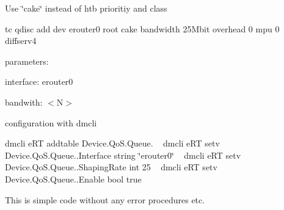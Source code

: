 Use \char`\"{}cake\char`\"{} instead of htb prioritiy and class

tc qdisc add dev erouter0 root cake bandwidth 25Mbit overhead 0 mpu 0 diffserv4

parameters\+:
\begin{DoxyItemize}
\item interface\+: erouter0 ~\newline

\item bandwith\+: $<$\+N$>$ ~\newline

\end{DoxyItemize}

configuration with dmcli

dmcli e\+RT addtable Device.\+Qo\+S.\+Queue. ~\newline
 dmcli e\+RT setv Device.\+Qo\+S.\+Queue..\+Interface string \char`\"{}erouter0\char`\"{} ~\newline
 dmcli e\+RT setv Device.\+Qo\+S.\+Queue..\+Shaping\+Rate int 25 ~\newline
 dmcli e\+RT setv Device.\+Qo\+S.\+Queue..\+Enable bool true ~\newline


This is simple code without any error procedures etc. 
